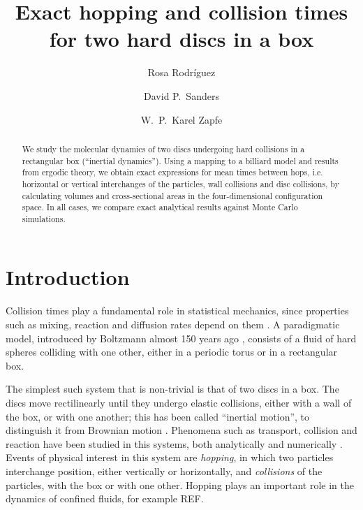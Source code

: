 \documentclass[superscriptaddress,pre,reprint,showpacs,twocolumn]{revtex4-1}
\begin{document}
\title{Exact hopping and collision times for two hard discs in a box}

\author{Rosa Rodríguez}

\author{David P.~Sanders}

\author{W.~P.~Karel Zapfe}



\begin{abstract}
We study the molecular dynamics of two discs undergoing hard collisions in a rectangular box (``inertial dynamics'').
Using a mapping to a billiard model and results from ergodic theory, we obtain exact expressions for mean times between hops, i.e. horizontal or vertical interchanges of the particles, wall collisions and disc collisions, by calculating
volumes and cross-sectional areas in the four-dimensional configuration space.
In all cases, we compare exact analytical results against Monte Carlo simulations.
\end{abstract}

\maketitle



\section{Introduction}


Collision times play a fundamental role in statistical mechanics, since properties
such as mixing, reaction and diffusion rates depend on them \cite{Boltz72, Tolman, VanKampen}.
A paradigmatic model, introduced by Boltzmann almost 150 years ago \cite{Boltz72, SzaszBook00},
consists of a fluid of hard spheres colliding with one other, either in a periodic torus or in
a rectangular box.

The simplest such system that is non-trivial is that of two discs in a box.
The discs move rectilinearly until they undergo
elastic collisions, either with a wall of the box, or with one another; this has been called ``inertial motion'', to distinguish it from Brownian motion \cite{Bowles04}.
Phenomena such as transport, collision and reaction
have been studied in this systems, both analytically 
 \cite{Awazu01, Munakata02, Suh05} and numerically \cite{MacElroy2004, MacElroy2005}.
 Events of physical interest in this system are \emph{hopping},
in which two particles interchange position, either vertically or horizontally,
and \emph{collisions} of the particles, with the box or with one other. Hopping plays an important role in the dynamics of confined fluids, for example
REF.
\end{document}
